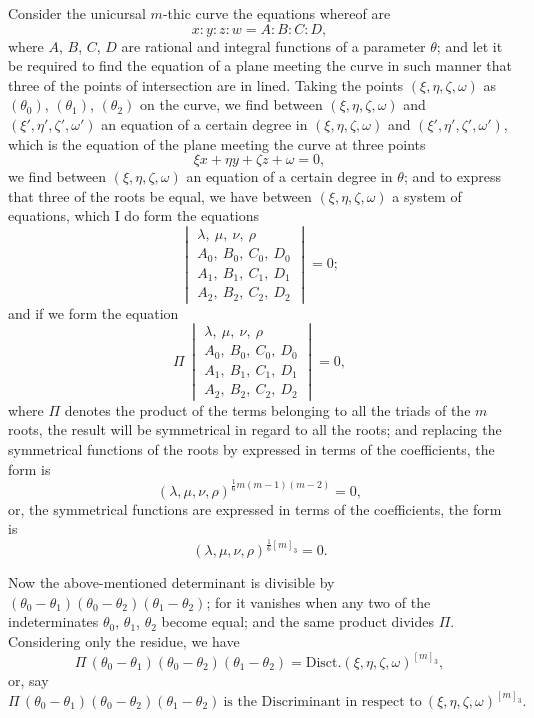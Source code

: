 \documentclass[11pt,a4paper]{article}
\begin{document}
\medskip

\noindent Consider the unicursal $m$-thic curve the equations whereof are
\[
x : y : z : w = A : B : C : D,
\]
where $A$, $B$, $C$, $D$ are rational and integral functions of a parameter $\theta$; and let it be required to find the equation of a plane meeting the curve in such manner that three of the points of intersection are in lined. Taking the points $(\xi, \eta, \zeta, \omega)$ as $(\theta_0)$, $(\theta_1)$, $(\theta_2)$ on the curve, we find between $(\xi, \eta, \zeta, \omega)$ and $(\xi', \eta', \zeta', \omega')$ an equation of a certain degree in $(\xi, \eta, \zeta, \omega)$ and $(\xi', \eta', \zeta', \omega')$, which is the equation of the plane meeting the curve at three points
\[
\xi x + \eta y + \zeta z + \omega = 0,
\]
we find between $(\xi, \eta, \zeta, \omega)$ an equation of a certain degree in $\theta$; and to express that three of the roots be equal, we have between $(\xi, \eta, \zeta, \omega)$ a system of equations, which I do form the equations
\[
\begin{vmatrix}
\lambda,\ \mu,\ \nu,\ \rho \\
A_0,\ B_0,\ C_0,\ D_0 \\
A_1,\ B_1,\ C_1,\ D_1 \\
A_2,\ B_2,\ C_2,\ D_2
\end{vmatrix} = 0;
\]
and if we form the equation
\[
\Pi\,\begin{vmatrix}
\lambda,\ \mu,\ \nu,\ \rho \\
A_0,\ B_0,\ C_0,\ D_0 \\
A_1,\ B_1,\ C_1,\ D_1 \\
A_2,\ B_2,\ C_2,\ D_2
\end{vmatrix} = 0,
\]
where $\Pi$ denotes the product of the terms belonging to all the triads of the $m$ roots, the result will be symmetrical in regard to all the roots; and replacing the symmetrical functions of the roots by expressed in terms of the coefficients, the form is
\[
(\lambda, \mu, \nu, \rho)^{\frac{1}{6}m(m-1)(m-2)} = 0,
\]
or, the symmetrical functions are expressed in terms of the coefficients, the form is
\[
(\lambda, \mu, \nu, \rho)^{\frac{1}{6}[m]_3} = 0.
\]

\medskip

\noindent Now the above-mentioned determinant is divisible by $(\theta_0 - \theta_1)(\theta_0 - \theta_2)(\theta_1 - \theta_2)$; for it vanishes when any two of the indeterminates $\theta_0$, $\theta_1$, $\theta_2$ become equal; and the same product divides $\Pi$. Considering only the residue, we have
\[
\Pi\,(\theta_0 - \theta_1)(\theta_0 - \theta_2)(\theta_1 - \theta_2) = \text{Disct.}(\xi, \eta, \zeta, \omega)^{[m]_3},
\]
or, say
\[
\Pi\,(\theta_0 - \theta_1)(\theta_0 - \theta_2)(\theta_1 - \theta_2)\ \text{is the Discriminant in respect to}\ (\xi, \eta, \zeta, \omega)^{[m]_3}.
\]
\end{document}

